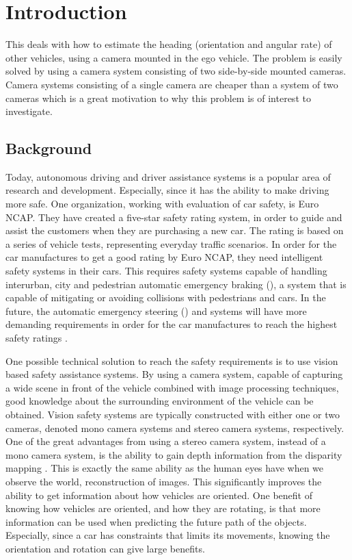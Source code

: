 \chapter{Introduction}
\label{cha:intro}
This \ms deals with how to estimate the heading (orientation and angular rate) of other vehicles, using a camera mounted in the ego vehicle.
The problem is easily solved by using a camera system consisting of two side-by-side mounted cameras.
Camera systems consisting of a single camera are cheaper than a system of two cameras which is a great motivation to why this problem is of interest to investigate.

\section{Background}
Today, autonomous driving and driver assistance systems is a popular area of research and development.
Especially, since it has the ability to make driving more safe. 
One organization, working with evaluation of car safety, is Euro NCAP.
They have created a five-star safety rating system, in order to guide and assist the customers when they are purchasing a new car.
The rating is based on a series of vehicle tests, representing everyday traffic scenarios. 
In order for the car manufactures to get a good rating by Euro NCAP, they need intelligent safety systems in their cars.
This requires safety systems capable of handling \eg interurban, city and pedestrian automatic emergency braking (\abbrAEB), \ie a system that is capable of mitigating or avoiding collisions with pedestrians and cars.
In the future, the automatic emergency steering (\abbrAES) and \abbrAEB systems will have more demanding requirements in order for the car manufactures to reach the highest safety ratings \cite{EuroNCAP:2017}.

One possible technical solution to reach the safety requirements is to use vision based safety assistance systems.
By using a camera system, capable of capturing a wide scene in front of the vehicle combined with image processing techniques, good knowledge about the surrounding environment of the vehicle can be obtained.
Vision safety systems are typically constructed with either one or two cameras, denoted mono camera systems and stereo camera systems, respectively.
One of the great advantages from using a stereo camera system, instead of a mono camera system, is the ability to gain depth information from the disparity mapping \citep{Sivaraman:2013}.
This is exactly the same ability as the human eyes have when we observe the world, \ie reconstruction of  images.
This significantly improves the ability to get information about how vehicles are \eg oriented.
One benefit of knowing how vehicles are oriented, and how they are rotating, is that more information can be used when predicting the future path of the objects.
Especially, since \eg a car has constraints that limits its movements, knowing the orientation and rotation can give large benefits.

